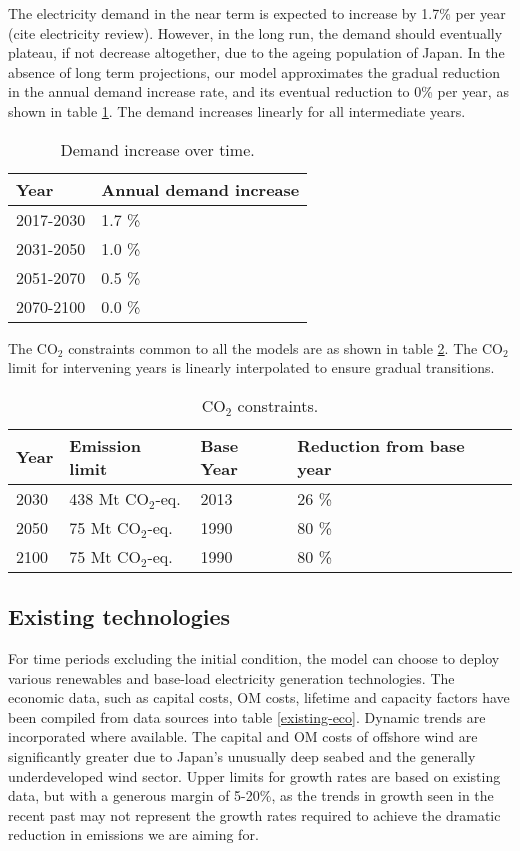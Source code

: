 The electricity demand in the near term is expected to increase by 1.7\% per year (cite electricity review). However, in the long run, the demand should eventually plateau, if not decrease altogether, due to the ageing population of Japan. In the absence of long term projections, our model approximates the gradual reduction in the annual demand increase rate, and its eventual reduction to 0\% per year, as shown in table \ref{demand}. The demand increases linearly for all intermediate years.

\begin{table}[!ht]
	\caption{Demand increase over time.}
	\vspace{0.1in}
	\begin{tabularx}{\textwidth}{p{} p{}}
		\hline
\textbf{Year} & \textbf{Annual demand increase} \\
\hline
2017-2030 & 1.7 \% \\
2031-2050 & 1.0 \% \\
2051-2070 & 0.5 \% \\
2070-2100 & 0.0 \% \\
\hline 
	\end{tabularx}
\label{demand}
\end{table}
The CO$_2$ constraints common to all the models are as shown in table \ref{co2-limits}. The CO$_2$ limit for intervening years is linearly interpolated to ensure gradual transitions. 
\begin{table}[!ht]
	\caption{CO$_2$ constraints.}
	\vspace{0.1in}
	\begin{tabularx}{\textwidth}{p{} p{}p{} p{}}
		\hline
\textbf{Year} & \textbf{Emission limit} & \textbf{Base Year} & \textbf{Reduction from base year} \\
\hline
2030 & 438 Mt CO$_2$-eq. & 2013 & 26 \% \\
2050 & 75 Mt CO$_2$-eq. & 1990 & 80 \% \\
2100 & 75 Mt CO$_2$-eq. & 1990 & 80 \% \\
\hline 
	\end{tabularx}
\label{co2-limits}
\end{table}

\subsection{Existing technologies}

For time periods excluding the initial condition, the model can choose to deploy various renewables and base-load electricity generation technologies. The economic data, such as capital costs, \gls{OM} costs, lifetime and capacity factors have been compiled from data sources into table \ref{existing-eco}. Dynamic trends are incorporated where available. The capital and \gls{OM} costs of offshore wind are significantly greater due to Japan's unusually deep seabed and the generally underdeveloped wind sector. Upper limits for growth rates are based on existing data, but with a generous margin of 5-20\%, as the trends in growth seen in the recent past may not represent the growth rates required to achieve the dramatic reduction in emissions we are aiming for.

